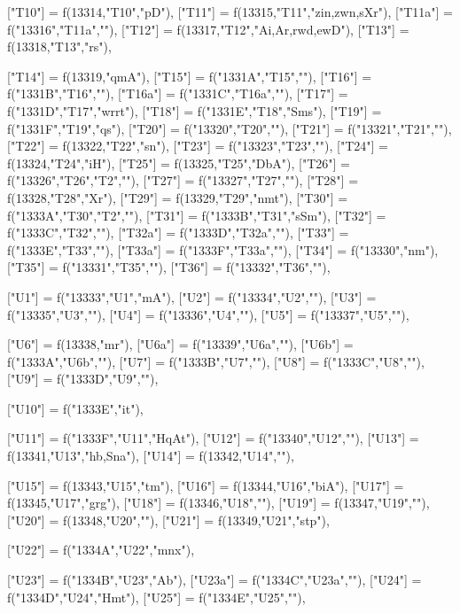 \documentclass{article}
\begin{document}
\begin{luacode*}
{	["T10"] = f(13314,"T10","pD"),
	["T11"] = f(13315,"T11","zin,zwn,sXr"),
["T11a"] = f("13316","T11a",""),
	["T12"] = f(13317,"T12","Ai,Ar,rwd,ewD"),
	["T13"] = f(13318,"T13","rs"),

	["T14"] = f(13319,"qmA"),
["T15"] = f("1331A","T15",""),
["T16"] = f("1331B","T16",""),
["T16a"] = f("1331C","T16a",""),
	["T17"] = f("1331D","T17","wrrt"),
	["T18"] = f("1331E","T18","Sms"),
	["T19"] = f("1331F","T19","qs"),
["T20"] = f("13320","T20",""),
["T21"] = f("13321","T21",""),
	["T22"] = f(13322,"T22","sn"),
["T23"] = f("13323","T23",""),
	["T24"] = f(13324,"T24","iH"),
	["T25"] = f(13325,"T25","DbA"),
["T26"] = f("13326","T26","T2",""),
["T27"] = f("13327","T27",""),
	["T28"] = f(13328,"T28","Xr"),
	["T29"] = f(13329,"T29","nmt"),
["T30"] = f("1333A","T30","T2",""),
	["T31"] = f("1333B","T31","sSm"),
["T32"] = f("1333C","T32",""),
["T32a"] = f("1333D","T32a",""),
["T33"] = f("1333E","T33",""),
["T33a"] = f("1333F","T33a",""),
	["T34"] = f("13330","nm"),
["T35"] = f("13331","T35",""),
["T36"] = f("13332","T36",""),

	["U1"] = f("13333","U1","mA"),
	["U2"] = f("13334","U2",""),
	["U3"] = f("13335","U3",""),
	["U4"] = f("13336","U4",""),
	["U5"] = f("13337","U5",""),


	["U6"] = f(13338,"mr"),
	["U6a"] = f("13339","U6a",""),
	["U6b"] = f("1333A","U6b",""),
	["U7"] = f("1333B","U7",""),
	["U8"] = f("1333C","U8",""),
	["U9"] = f("1333D","U9",""),

	["U10"] = f("1333E","it"),

	["U11"] = f("1333F","U11","HqAt"),
	["U12"] = f("13340","U12",""),
	["U13"] = f(13341,"U13","hb,Sna"),
	["U14"] = f(13342,"U14",""),

	["U15"] = f(13343,"U15","tm"),
	["U16"] = f(13344,"U16","biA"),
	["U17"] = f(13345,"U17","grg"),
	["U18"] = f(13346,"U18",""),
	["U19"] = f(13347,"U19",""),
	["U20"] = f(13348,"U20",""),
	["U21"] = f(13349,"U21","stp"),

	["U22"] = f("1334A","U22","mnx"),

	["U23"] = f("1334B","U23","Ab"),
	["U23a"] = f("1334C","U23a",""),
	["U24"] = f("1334D","U24","Hmt"),
	["U25"] = f("1334E","U25",""),

}
\end{luacode*}
\end{document}
